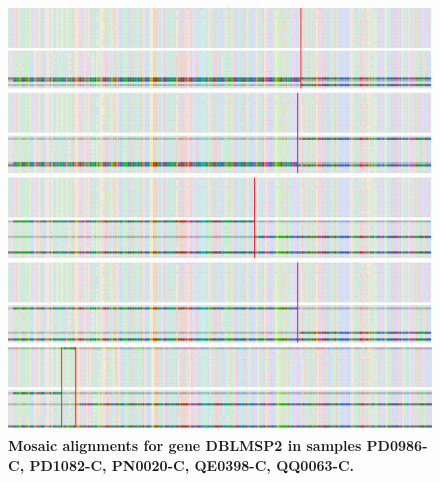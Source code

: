 \documentclass[12pt]{article}
\begin{document}
\begin{figure}
    \centering
    \centerline{\includegraphics[width=1.2\textwidth]{DBLMSP2_PD0986-C_PD1082-C_PN0020-C_QE0398-C_QQ0063-C.png}}
    \caption[Mosaic alignments (7)]{
        \textbf{Mosaic alignments for gene DBLMSP2 in samples PD0986-C, PD1082-C,
        PN0020-C, QE0398-C, QQ0063-C.}
        }
    \label{pa:fig:mosaic_app7}
\end{figure}
\end{document}
